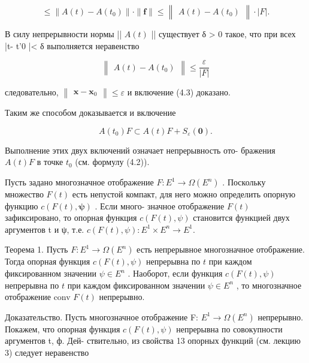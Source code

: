 \documentclass[8pt]{extarticle}
\begin{document}
\[
\leq  \parallel A\left( t\right)  - A\left( {t}_{0}\right) \parallel  \cdot  \parallel \mathbf{f}\parallel  \leq  \left\lVert \begin{array}{c} {A\left( t\right)  - A\left( {t}_{0}\right) } \end{array} \right\rVert \cdot  \left| F\right| .
\]

В силу непрерывности нормы || \(A\left( t\right)\) || существует δ > 0 такое, что при всех |t- t'0 |< δ выполняется неравенство

\[
\left\lVert \begin{array}{c} {A\left( t\right)  - A\left( {t}_{0}\right) } \end{array} \right\rVert \leq  \frac{\varepsilon }{\left| F\right| }
\]

следовательно, \(\left\lVert \begin{array}{c} {\mathbf{x} - {\mathbf{x}}_{0}} \end{array} \right\rVert \leq  \varepsilon\) и включение (4.3) доказано.

Таким же способом доказывается и включение

\[
A\left( {t}_{0}\right) F \subset  A\left( t\right) F + {S}_{\varepsilon }\left( \mathbf{0}\right) .
\]

Выполнение этих двух включений означает непрерывность ото- бражения \(A\left( t\right) F\) в точке \({t}_{0}\) (см. формулу (4.2)).

Пусть задано многозначное отображение \(F : {E}^{1} \rightarrow  \Omega \left( {E}^{n}\right)\) . Поскольку множество \(F\left( t\right)\) есть непустой компакт, для него можно определить опорную функцию \(c\left( {F\left( t\right) ,\mathbf{\psi }}\right)\) . Если много- значное отображение \(F\left( t\right)\) зафиксировано, то опорная функция \(c\left( {F\left( t\right) ,\psi }\right)\) становится функцией двух аргументов t и ψ, т.е. \(c\left( {F\left( t\right) ,\psi }\right)  : {E}^{1} \times  {E}^{n} \rightarrow  {E}^{1}.\)

Теорема 1. Пусть \(F : {E}^{1} \rightarrow  \Omega \left( {E}^{n}\right)\) есть непрерывное многозначное отображение. Тогда опорная функция \(c\left( {F\left( t\right) ,\psi }\right)\) непрерывна по \(t\) при каждом фиксированном значении \(\psi  \in  {E}^{n}\) . Наоборот, если функция \(c\left( {F\left( t\right) ,\psi }\right)\) непрерывна по \(t\) при каждом фиксированном значении \(\psi  \in  {E}^{n}\) , то многозначное отображение conv \(F\left( t\right)\) непрерывно.

Доказательство. Пусть многозначное отображение F: \({E}^{1} \rightarrow  \Omega \left( {E}^{n}\right)\) непрерывно. Покажем, что опорная функция \(c\left( {F\left( t\right) ,\psi }\right)\) непрерывна по совокупности аргументов t, ф. Дей- ствительно, из свойства 13 опорных функций (см. лекцию 3) следует неравенство
\end{document}
